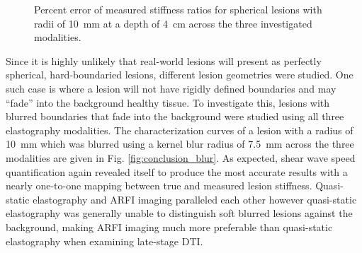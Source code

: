 			\begin{figure}[!htb]
				\centering
				\caption[Percent error of measured stiffness ratios for spherical lesions across the three investigated modalities]{Percent error of measured stiffness ratios for spherical lesions with radii of \SI{10}{\mm} at a depth of \SI{4}{\cm} across the three investigated modalities.}
				\label{fig:conclusions_radius_pd}
			\end{figure}

			Since it is highly unlikely that real-world lesions will present as perfectly spherical, hard-boundaried lesions, different lesion geometries were studied. One such case is where a lesion will not have rigidly defined boundaries and may ``fade'' into the background healthy tissue. To investigate this, lesions with blurred boundaries that fade into the background were studied using all three elastography modalities. The characterization curves of a lesion with a radius of \SI{10}{\mm} which was blurred using a kernel blur radius of \SI{7.5}{\mm} across the three modalities are given in Fig. \ref{fig:conclusion_blur}. As expected, shear wave speed quantification again revealed itself to produce the most accurate results with a nearly one-to-one mapping between true and measured lesion stiffness. Quasi-static elastography and ARFI imaging paralleled each other however quasi-static elastography was generally unable to distinguish soft blurred lesions against the background, making ARFI imaging much more preferable than quasi-static elastography when examining late-stage DTI.


